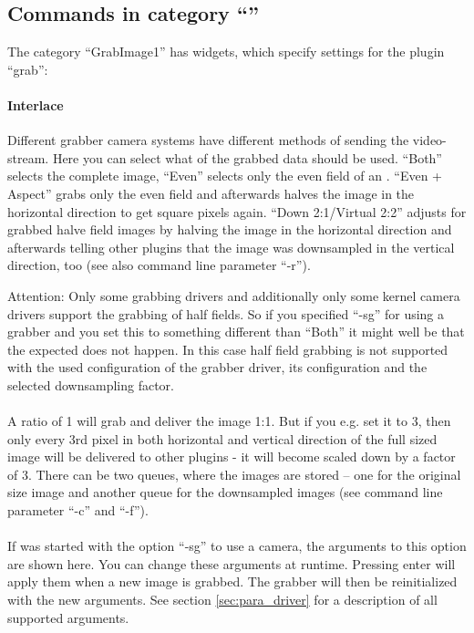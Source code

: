 \subsection{Commands in category ``''}
\label{sub:gui_grab}

The category ``GrabImage1'' has widgets, which specify settings for the
plugin ``grab'':

\paragraph{Interlace}
Different grabber camera systems have different methods of sending
the video-stream. Here you can select what of the grabbed data
should be used. ``Both'' selects the complete image, ``Even''
selects only the even field of an . ``Even +
Aspect'' grabs only the even field and afterwards halves the image
in the horizontal direction to get square pixels again. ``Down
2:1/Virtual 2:2'' adjusts for grabbed halve field images by halving
the image in the horizontal direction and afterwards telling other
plugins that the image was downsampled in the vertical direction,
too (see also command line parameter ``-r'').

Attention: Only some grabbing drivers and additionally only some
kernel camera drivers support the grabbing of half fields. So if you
specified ``-sg'' for using a grabber and you set this to something
different than ``Both'' it might well be that the expected does not
happen. In this case half field grabbing is not supported with the
used configuration of the grabber driver, its configuration and the
selected downsampling factor.

\paragraph{\label{para:downsampling}}
A ratio of 1 will grab and deliver the image 1:1. But if you
e.g. set it to 3, then only every 3rd pixel in both horizontal and
vertical direction of the full sized image will be delivered to
other plugins - it will become scaled down by a factor of 3. There
can be two queues, where the images are stored -- one for the
original size image and another queue for the downsampled images
(see command line parameter ``-c'' and ``-f'').

\paragraph{}\label{para:grabOptions}
If \icewing{} was started with the option ``-sg'' to use a camera,
the arguments to this option are shown here. You can change these
arguments at runtime. Pressing enter will apply them when a new
image is grabbed. The grabber will then be reinitialized with the
new arguments. See section \ref{sec:para_driver} for a description
of all supported arguments.

